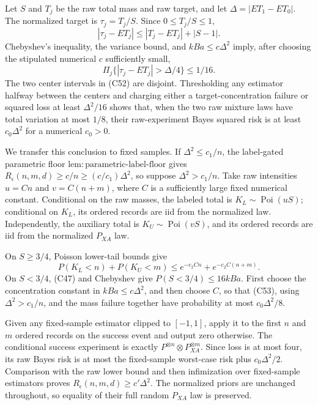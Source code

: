 Let \(S\) and \(T_j\) be the raw total mass and raw target, and let \(\Delta=|ET_1-ET_0|\).  The normalized target is \(\tau_j=T_j/S\).  Since \(0\le T_j/S\le1\),
\[
 |\tau_j-ET_j|\le|T_j-ET_j|+|S-1|.                                \tag{C51}
\]
Chebyshev's inequality, the variance bound, and \(kBa\le c\Delta^2\) imply, after choosing the stipulated numerical \(c\) sufficiently small,
\[
 \Pi_j\{|\tau_j-ET_j|>\Delta/4\}\le1/16.                          \tag{C52}
\]
The two center intervals in (C52) are disjoint.  Thresholding any estimator halfway between the centers and charging either a target-concentration failure or squared loss at least \(\Delta^2/16\) shows that, when the two raw mixture laws have total variation at most \(1/8\), their raw-experiment Bayes squared risk is at least \(c_0\Delta^2\) for a numerical \(c_0>0\).

We transfer this conclusion to fixed samples.  If \(\Delta^2\le c_1/n\), the label-gated parametric floor \(\mathrm{lem:parametric\mbox{-}label\mbox{-}floor}\) gives \(R_\epsilon(n,m,d)\ge c/n\ge(c/c_1)\Delta^2\), so suppose \(\Delta^2>c_1/n\).  Take raw intensities \(u=Cn\) and \(v=C(n+m)\), where \(C\) is a sufficiently large fixed numerical constant.  Conditional on the raw masses, the labeled total is \(K_L\sim\operatorname{Poi}(uS)\); conditional on \(K_L\), its ordered records are iid from the normalized law.  Independently, the auxiliary total is \(K_U\sim\operatorname{Poi}(vS)\), and its ordered records are iid from the normalized \(P_{XA}\) law.

On \(S\ge3/4\), Poisson lower-tail bounds give
\[
 P(K_L<n)+P(K_U<m)\le e^{-c_2Cn}+e^{-c_2C(n+m)}.                   \tag{C53}
\]
On \(S<3/4\), (C47) and Chebyshev give \(P(S<3/4)\le16kBa\).  First choose the concentration constant in \(kBa\le c\Delta^2\), and then choose \(C\), so that (C53), using \(\Delta^2>c_1/n\), and the mass failure together have probability at most \(c_0\Delta^2/8\).

Given any fixed-sample estimator clipped to \([-1,1]\), apply it to the first \(n\) and \(m\) ordered records on the success event and output zero otherwise.  The conditional success experiment is exactly \(P^{\otimes n}\otimes P_{XA}^{\otimes m}\).  Since loss is at most four, its raw Bayes risk is at most the fixed-sample worst-case risk plus \(c_0\Delta^2/2\).  Comparison with the raw lower bound and then infimization over fixed-sample estimators proves \(R_\epsilon(n,m,d)\ge c'\Delta^2\).  The normalized priors are unchanged throughout, so equality of their full random \(P_{XA}\) law is preserved.

